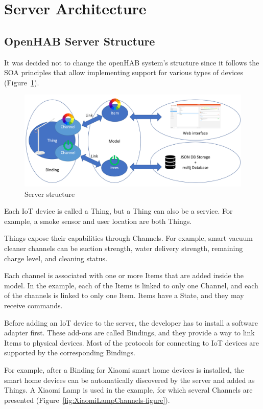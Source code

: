 \section{Server Architecture}
\subsection{OpenHAB Server Structure}

It was decided not to change the openHAB system's structure since it follows the SOA principles that allow implementing support for various types of devices (Figure~\ref{fig:openHABServerStructure-figure}).

\begin{figure}
  \centering
  \includegraphics[width=0.9\linewidth]{figures/openHABServerStructure.png}
  \caption{Server structure}
  \label{fig:openHABServerStructure-figure}
\end{figure}

Each IoT device is called a Thing, but a Thing can also be a  service. For example, a smoke sensor and user location are both Things.

Things expose their capabilities through Channels. For example, smart vacuum cleaner channels can be suction strength, water delivery strength, remaining charge level, and cleaning status.

Each channel is associated with one or more Items that are added inside the model. In the example, each of the Items is linked to only one Channel, and each of the channels is linked to only one Item. Items have a State, and they may receive commands. 

Before adding an IoT device to the server, the developer has to install a software adapter first. These add-ons are called Bindings, and they provide a way to link Items to physical devices. Most of the protocols for connecting to IoT devices are supported by the corresponding Bindings.

For example, after a Binding for Xiaomi smart home devices is installed, the smart home devices can be automatically discovered by the server and added as Things. A Xiaomi Lamp is used in the example, for which several Channels are presented (Figure~\ref{fig:XiaomiLampChannels-figure}).

